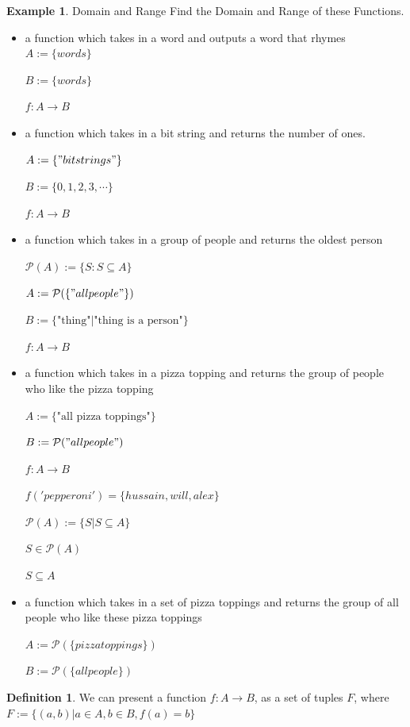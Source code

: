 \documentclass[letterpaper,10pt]{article}
\theoremstyle{plain}
\theoremstyle{definition}
\newtheorem{defn}[thm]{Definition}
\newtheorem{exmp}[thm]{Example}
\theoremstyle{remark}
\begin{document}
\newpage
\begin{exmp}{Domain and Range}
Find the Domain and Range of these Functions. 

\begin{itemize}
\item a function which takes in a word and outputs a word that rhymes
\newline
$A:=\{words \}$

$B:=\{ words\}$

$f:A\to B$

\item a function which takes in a bit string and returns the number of ones.

$A:=\{"bit strings" \}$

$B:=\{0, 1, 2, 3, \cdots \}$

$f:A\to B$

\item a function which takes in a group of people and returns the oldest person

$\mathcal{P}(A):=\{S: S\subseteq A\}$

$A:=\mathcal{P}(\{"all people"\})$

$B:=\{\text{"thing"} | \text{"thing is a person"}\}$

$f:A\to B$

\item a function which takes in a pizza topping and returns the group of people who like the pizza topping

$A:=\{\text{"all pizza toppings"}\}$

$B:=\mathcal{P}("all people")$

$f:A\to B$

$f('pepperoni')=\{hussain, will, alex \}$

$\mathcal{P}(A):=\{S |S\subseteq A\}$

$S \in \mathcal{P}(A)$

$S \subseteq A$

\item a function which takes in a set of pizza toppings and returns the group of all people who like these pizza toppings

$A:=\mathcal{P}(\{pizza toppings\})$

$B:=\mathcal{P}(\{all people\})$


\end{itemize}
\end{exmp}
\begin{defn}
We can present a function $f:A\to B$, as a set of tuples $F$, where $F:=\{(a,b)| a\in A, b \in B, f(a)=b\}$
\end{defn}
\end{document}
